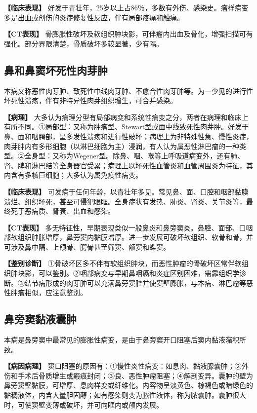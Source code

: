 \textbf{【临床表现】}
好发于青壮年，25岁以上占86％，多数有外伤、感染史。瘤样病变多是出血或创伤的炎症修复性反应，伴有局部疼痛和触痛。

\textbf{【CT表现】}
骨膨胀性破坏及软组织肿块影，可伴瘤内出血及骨化，增强扫描可有强化。部分界限清楚，骨质破坏多较显著，少有隔。

\subsection{鼻和鼻窦坏死性肉芽肿}

本病又称恶性肉芽肿、致死性中线肉芽肿、不愈合性肉芽肿等。为一少见的进行性坏死性溃疡，伴有非特异性肉芽组织增生，可合并感染。

\textbf{【病理】}
大多认为病理分型有局部病变和系统性病变之分，两者在病理和临床上有所不同。①局部型：又称为肿瘤型、Stewart型或面中线致死性肉芽肿。好发于鼻、面和咽腭部，呈多发性溃疡和进行性破坏；病理上为非特殊性急、慢性炎症，肉芽肿内有多形细胞（以淋巴细胞为主）浸润，有人认为属恶性淋巴瘤的一种类型。②全身型：又称为Wegener型。除鼻、咽、喉等上呼吸道病变外，还有肺、肾、脾和淋巴结等全身器官受累；病理上以坏死性血管炎和血管周围炎为特征，其内含有多核巨细胞；大多认为属免疫性病变。

\textbf{【临床表现】}
可发病于任何年龄，以青壮年多见。常见鼻、面、口腔和咽部黏膜溃烂、组织坏死，甚至可侵犯眼眶。全身症状有发热、肺炎、肾炎、关节炎等，最终死于恶病质、肾衰、出血和感染。

\textbf{【CT表现】}
多无特征性，早期表现类似一般鼻炎和鼻旁窦炎。鼻腔、面部、口咽部软组织肿胀增厚，鼻旁窦内黏膜增厚。进一步发展可破坏软组织、软骨和骨，并可涉及鼻中隔、上颌骨、腭骨甚至筛窦、额窦和蝶窦。

\textbf{【鉴别诊断】}
①骨破坏区多不伴有软组织肿块，而恶性肿瘤的骨破坏区常伴软组织肿块影，可以鉴别。②咽部病变与早期鼻咽癌和炎症区别困难，需靠组织学诊断。③结节病形成的肉芽肿可以充满鼻旁窦腔并使窦壁膨胀，与本病、淋巴瘤等恶性肿瘤相似，应注意鉴别。

\subsection{鼻旁窦黏液囊肿}

本病是鼻旁窦中最常见的膨胀性病变，是由于鼻旁窦开口阻塞后窦内黏液潴积所致。

\textbf{【病因病理】}
窦口阻塞的原因有：①慢性炎性病变：如息肉、黏液腺囊肿；②外伤和手术后骨质增生或瘢痕封闭；③良、恶性肿瘤阻塞；④解剖变异。囊肿的壁为鼻旁窦壁黏膜，可增厚、息肉样变或纤维化。内容物呈淡黄色、棕褐色或暗绿色的黏稠液体，内含大量胆固醇；如有感染则变为脓性液体，称为脓囊肿。囊肿很大时，可使窦壁变薄或破坏，并可向眶内或颅内发展。

